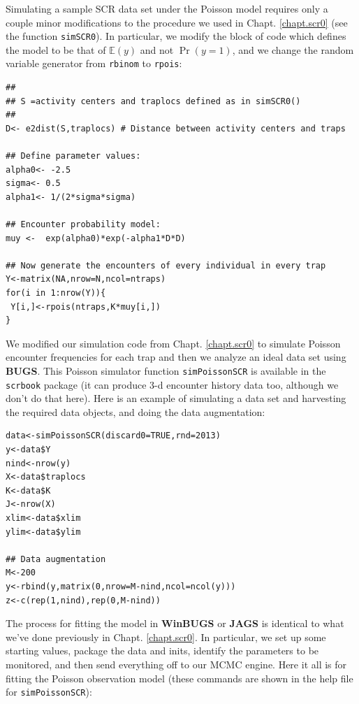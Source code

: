 Simulating a sample SCR data set under the Poisson model requires only
a couple minor modifications to the procedure we used in
Chapt. \ref{chapt.scr0} (see the function \mbox{\tt simSCR0}). In
particular, we modify the block of code which defines the model to be
that of $\mathbb{E}(y)$ and not $\Pr(y=1)$, and we change the random
variable generator from \mbox{\tt rbinom} to \mbox{\tt rpois}: 
\begin{samepage}
{\small
\begin{verbatim}
##
## S =activity centers and traplocs defined as in simSCR0()
##
D<- e2dist(S,traplocs) # Distance between activity centers and traps

## Define parameter values:
alpha0<- -2.5
sigma<- 0.5
alpha1<- 1/(2*sigma*sigma)

## Encounter probability model:
muy <-  exp(alpha0)*exp(-alpha1*D*D)

## Now generate the encounters of every individual in every trap
Y<-matrix(NA,nrow=N,ncol=ntraps)
for(i in 1:nrow(Y)){
 Y[i,]<-rpois(ntraps,K*muy[i,])
}
\end{verbatim}
}
\end{samepage}

We modified our simulation code from Chapt. \ref{chapt.scr0} to
simulate Poisson encounter frequencies for each trap and then we
analyze an ideal data set using {\bf BUGS}. This Poisson simulator
function {\tt simPoissonSCR} is available in the \mbox{\tt scrbook}
package (it can produce 3-d encounter history data too, although we
don't do that here).  Here is an example of simulating a data set and
harvesting the required data objects, and doing the data augmentation:

\begin{samepage}
{\small
\begin{verbatim}
data<-simPoissonSCR(discard0=TRUE,rnd=2013)
y<-data$Y
nind<-nrow(y)
X<-data$traplocs
K<-data$K
J<-nrow(X)
xlim<-data$xlim
ylim<-data$ylim

## Data augmentation
M<-200
y<-rbind(y,matrix(0,nrow=M-nind,ncol=ncol(y)))
z<-c(rep(1,nind),rep(0,M-nind))
\end{verbatim}
}
\end{samepage}

The process for fitting
the model in {\bf WinBUGS} or {\bf JAGS} is identical to what we've done
previously in Chapt. \ref{chapt.scr0}. In particular, we set up some
starting values, package the data and inits, identify the parameters
to be monitored, and then send everything off to our MCMC engine. Here
it all is for fitting the Poisson observation model (these commands
are shown in the help file for \mbox{\tt simPoissonSCR}):

